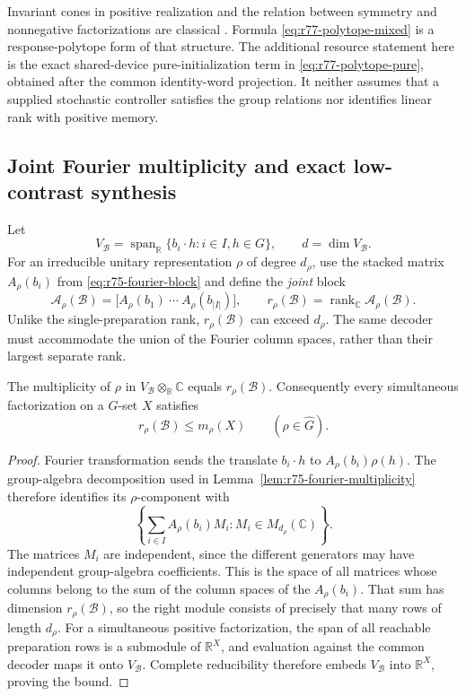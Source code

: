 Invariant cones in positive realization and the relation between symmetry
and nonnegative factorizations are classical
\cite{Heller65,BenvenutiFarina04,GPT13}.  Formula
\eqref{eq:r77-polytope-mixed} is a response-polytope form of that structure.
The additional resource statement here is the exact shared-device
pure-initialization term in \eqref{eq:r77-polytope-pure}, obtained after
the common identity-word projection.  It neither assumes that a supplied
stochastic controller satisfies the group relations nor identifies linear
rank with positive memory.

\subsection{Joint Fourier multiplicity and exact low-contrast synthesis}
Let
\[
 V_{\mathcal B}=\operatorname{span}_{\mathbb R}
    \{b_i\cdot h:i\in I,h\in G\},\qquad d=\dim V_{\mathcal B}.
\]
For an irreducible unitary representation $\rho$ of degree $d_\rho$,
use the stacked matrix $A_\rho(b_i)$ from
\eqref{eq:r75-fourier-block} and define the \emph{joint} block
\begin{equation}\label{eq:r77-joint-fourier}
 \mathcal A_\rho(\mathcal B)=
   \bigl[A_\rho(b_1)\ \cdots\ A_\rho(b_{|I|})\bigr],
 \qquad r_\rho(\mathcal B)=\operatorname{rank}_{\mathbb C}
                                  \mathcal A_\rho(\mathcal B).
\end{equation}
Unlike the single-preparation rank, $r_\rho(\mathcal B)$ can exceed
$d_\rho$.  The same decoder must accommodate the union of the Fourier
column spaces, rather than their largest separate rank.

\begin{lemma}
\label{lem:r77-joint-multiplicity}
The multiplicity of $\rho$ in
$V_{\mathcal B}\otimes_{\mathbb R}\mathbb C$ equals
$r_\rho(\mathcal B)$.  Consequently every simultaneous factorization
on a $G$-set $X$ satisfies
\[
 r_\rho(\mathcal B)\le m_\rho(X)\qquad(\rho\in\widehat G).
\]
\end{lemma}
\begin{proof}
Fourier transformation sends the translate $b_i\cdot h$ to
$A_\rho(b_i)\rho(h)$.  The group-algebra decomposition used in
Lemma~\ref{lem:r75-fourier-multiplicity} therefore identifies its
$\rho$-component with
\[
 \left\{\sum_{i\in I}A_\rho(b_i)M_i:
                       M_i\in M_{d_\rho}(\mathbb C)\right\}.
\]
The matrices $M_i$ are independent, since the different generators may
have independent group-algebra coefficients.  This is the space of all
matrices whose columns belong to the sum of the column spaces of the
$A_\rho(b_i)$.  That sum has dimension $r_\rho(\mathcal B)$, so the
right module consists of precisely that many rows of length $d_\rho$.
For a simultaneous positive factorization, the span of all reachable
preparation rows is a submodule of $\mathbb R^X$, and evaluation against
the common decoder maps it onto $V_{\mathcal B}$.  Complete reducibility
therefore embeds $V_{\mathcal B}$ into $\mathbb R^X$, proving the bound.
\end{proof}

